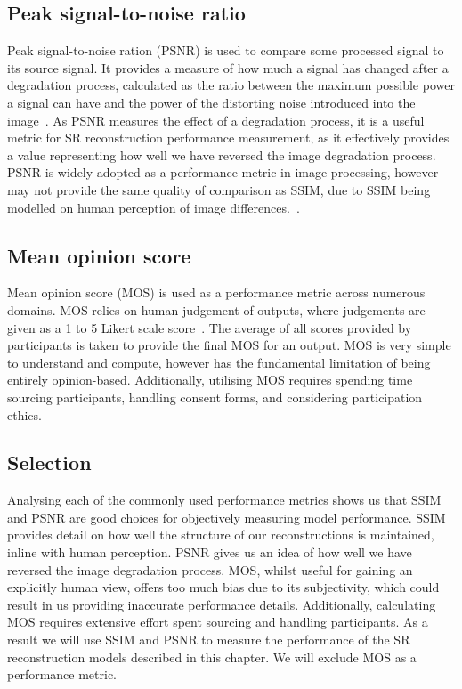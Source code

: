 \subsection{Peak signal-to-noise ratio}
Peak signal-to-noise ration (PSNR) is used to compare some processed signal to its source signal. It provides a measure of how much a signal has changed after a degradation process, calculated as the ratio between the maximum possible power a signal can have and the power of the distorting noise introduced into the image~\cite{psnr}. As PSNR measures the effect of a degradation process, it is a useful metric for SR reconstruction performance measurement, as it effectively provides a value representing how well we have reversed the image degradation process. PSNR is widely adopted as a performance metric in image processing, however may not provide the same quality of comparison as SSIM, due to SSIM being modelled on human perception of image differences.~\cite{psnrAnalysis}.

\subsection{Mean opinion score}
Mean opinion score (MOS) is used as a performance metric across numerous domains. MOS relies on human judgement of outputs, where judgements are given as a 1 to 5 Likert scale score~\cite{srgan}. The average of all scores provided by participants is taken to provide the final MOS for an output. MOS is very simple to understand and compute, however has the fundamental limitation of being entirely opinion-based. Additionally, utilising MOS requires spending time sourcing participants, handling consent forms, and considering participation ethics.

\subsection{Selection}
Analysing each of the commonly used performance metrics shows us that SSIM and PSNR are good choices for objectively measuring model performance. SSIM provides detail on how well the structure of our reconstructions is maintained, inline with human perception. PSNR gives us an idea of how well we have reversed the image degradation process. MOS, whilst useful for gaining an explicitly human view, offers too much bias due to its subjectivity, which could result in us providing inaccurate performance details. Additionally, calculating MOS requires extensive effort spent sourcing and handling participants. As a result we will use SSIM and PSNR to measure the performance of the SR reconstruction models described in this chapter. We will exclude MOS as a performance metric.